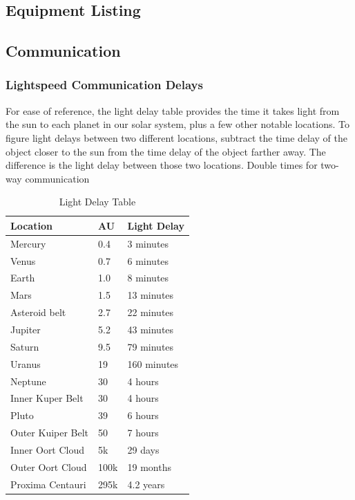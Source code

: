 \begin{multicols}{2}

\section{Equipment Listing}

\subsection{Communication}

\subsubsection{Lightspeed Communication Delays}

For ease of reference, the light delay table provides the time it takes light from the sun to each planet in our solar system, plus a few other notable locations. To figure light delays between two different locations, subtract the time delay of the object closer to the sun from the time delay of the object farther away. The difference is the light delay between those two locations. Double times for two-way communication

\end{multicols}

\begin{table}[h]

\centering
\caption{Light Delay Table}
\label{lab:Light Delay Table}

\begin{tabularx}{\textwidth}{ | Y | Y | Y |}
\hline
\textbf{Location} & \textbf{AU} & \textbf{Light Delay} \\ \hline

Mercury & 0.4 & 3 minutes \\ \hline
Venus & 0.7 & 6 minutes \\ \hline
Earth & 1.0 & 8 minutes \\ \hline
Mars & 1.5 & 13 minutes \\ \hline
Asteroid belt & 2.7 & 22 minutes \\ \hline
Jupiter & 5.2 & 43 minutes \\ \hline
Saturn & 9.5 & 79 minutes \\ \hline
Uranus & 19 & 160 minutes \\ \hline
Neptune & 30 & 4 hours \\ \hline
Inner Kuper Belt & 30 & 4 hours \\ \hline
Pluto & 39 & 6 hours \\ \hline
Outer Kuiper Belt & 50 & 7 hours \\ \hline
Inner Oort Cloud & 5k & 29 days \\ \hline
Outer Oort Cloud & 100k & 19 months \\ \hline
Proxima Centauri & 295k & 4.2 years \\ \hline

\end{tabularx}
\end{table}

